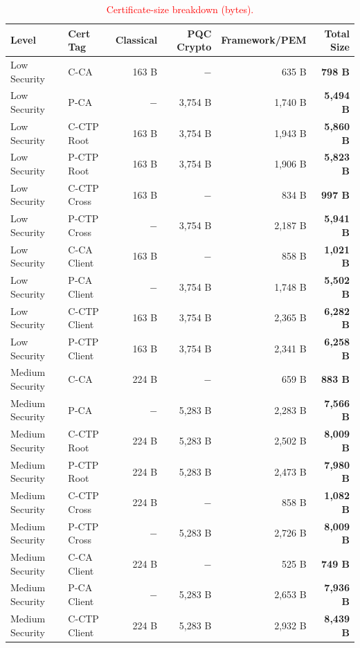 \begin{table}[htbp]
  \centering
  \caption{\textcolor{red}{Certificate-size breakdown (bytes).}}
  \label{tab:cert-sizes}
  \begin{tabular}{llrrrr}
    \toprule
    \textbf{Level} & \textbf{Cert Tag} & \textbf{Classical} & \textbf{PQC Crypto} & \textbf{Framework/PEM} & \textbf{Total Size} \\
    \midrule
  Low Security & C-CA & 163 B & $-$ & 635 B & \textbf{798 B} \\
  Low Security & P-CA & $-$ & 3,754 B & 1,740 B & \textbf{5,494 B} \\
  Low Security & C-CTP Root & 163 B & 3,754 B & 1,943 B & \textbf{5,860 B} \\
  Low Security & P-CTP Root & 163 B & 3,754 B & 1,906 B & \textbf{5,823 B} \\
  Low Security & C-CTP Cross & 163 B & $-$ & 834 B & \textbf{997 B} \\
  Low Security & P-CTP Cross & $-$ & 3,754 B & 2,187 B & \textbf{5,941 B} \\
  Low Security & C-CA Client & 163 B & $-$ & 858 B & \textbf{1,021 B} \\
  Low Security & P-CA Client & $-$ & 3,754 B & 1,748 B & \textbf{5,502 B} \\
  Low Security & C-CTP Client & 163 B & 3,754 B & 2,365 B & \textbf{6,282 B} \\
  Low Security & P-CTP Client & 163 B & 3,754 B & 2,341 B & \textbf{6,258 B} \\
  Medium Security & C-CA & 224 B & $-$ & 659 B & \textbf{883 B} \\
  Medium Security & P-CA & $-$ & 5,283 B & 2,283 B & \textbf{7,566 B} \\
  Medium Security & C-CTP Root & 224 B & 5,283 B & 2,502 B & \textbf{8,009 B} \\
  Medium Security & P-CTP Root & 224 B & 5,283 B & 2,473 B & \textbf{7,980 B} \\
  Medium Security & C-CTP Cross & 224 B & $-$ & 858 B & \textbf{1,082 B} \\
  Medium Security & P-CTP Cross & $-$ & 5,283 B & 2,726 B & \textbf{8,009 B} \\
  Medium Security & C-CA Client & 224 B & $-$ & 525 B & \textbf{749 B} \\
  Medium Security & P-CA Client & $-$ & 5,283 B & 2,653 B & \textbf{7,936 B} \\
  Medium Security & C-CTP Client & 224 B & 5,283 B & 2,932 B & \textbf{8,439 B} \\

\end{tabular}
\end{table}

